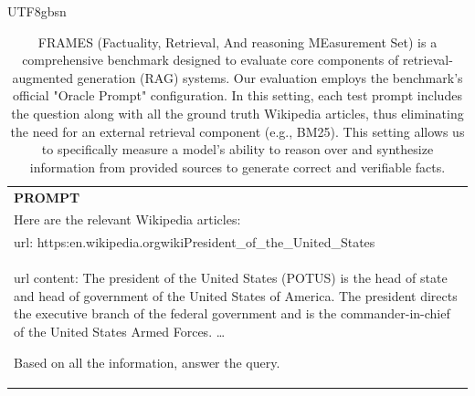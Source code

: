 \documentclass[11pt, a4paper, logo, copyright, nonumbering]{deepseek}
\begin{document}
\begin{CJK*}{UTF8}{gbsn}
\begin{table}[h]
    \centering \small
        \caption{FRAMES (Factuality, Retrieval, And reasoning MEasurement Set) is a comprehensive benchmark designed to evaluate core components of retrieval-augmented generation (RAG) systems. Our evaluation employs the benchmark's official "Oracle Prompt" configuration. In this setting, each test prompt includes the question along with all the ground truth Wikipedia articles, thus eliminating the need for an external retrieval component (e.g., BM25). This setting allows us to specifically measure a model's ability to reason over and synthesize information from provided sources to generate correct and verifiable facts. }
    \label{tab:frames_eval_format_example}
    \begin{tabular}{p{}}
    \hline
    \textbf{PROMPT}\\
    Here are the relevant Wikipedia articles: \\
url: https:\/\/en.wikipedia.org\/wiki\/President\_of\_the\_United\_States \\
url content: The president of the United States (POTUS) is the head of state and head of government of the United States of America. The president directs the executive branch of the federal government and is the commander-in-chief of the United States Armed Forces.
\ldots

Based on all the information, answer the query. 


\end{tabular}
\end{table}
\end{CJK*}
\end{document}
